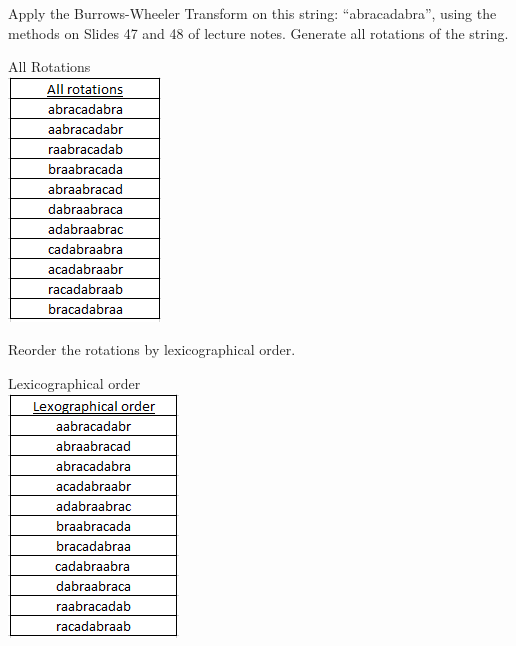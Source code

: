 \documentclass[10pt]{article}
\newenvironment{exercise}[2][Exercise]{\begin{trivlist}
\item[\hskip \labelsep {\bfseries #1}\hskip \labelsep {\bfseries #2.}]}{\end{trivlist}}
\newenvironment{solution}[2][Solution]{\begin{trivlist}
\item[\hskip \labelsep {\bfseries #1}\hskip \labelsep {\bfseries #2.}]}{\end{trivlist}}
\theoremstyle{definition}
\begin{document}
\begin{exercise}{(2A)} %
Apply the Burrows-Wheeler Transform on this string: “abracadabra”, using the methods on
Slides 47 and 48 of lecture notes. Generate all rotations of the string.
\end{exercise}

\begin{solution}{(2A)}
All Rotations\\






\includegraphics{allrot.PNG}\\
\end{solution}

\begin{exercise}{(2B)}
Reorder the rotations by lexicographical order.
\end{exercise}

\begin{solution}{(2B)}
Lexicographical order\\





\includegraphics{lexical.PNG}\\
\end{solution}
\end{document}
